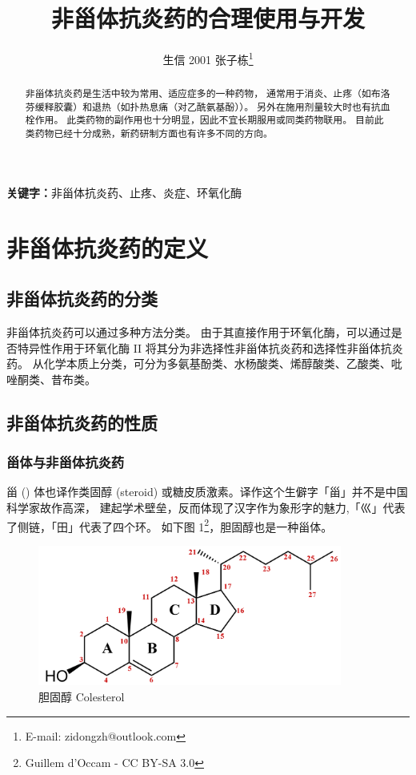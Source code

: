 \documentclass[12pt, a4paper, oneside]{ctexart}
\title{非甾体抗炎药的合理使用与开发}
\author{生信 2001 张子栋\thanks{E-mail: zidongzh@outlook.com}}
\date{}
\begin{document}
\maketitle
\thispagestyle{empty}
\newpage

\tableofcontents

\thispagestyle{empty}
\setcounter{page}{0}

\newpage

\begin{abstract}
    非甾体抗炎药是生活中较为常用、适应症多的一种药物，
    通常用于消炎、止疼（如布洛芬缓释胶囊）和退热（如扑热息痛（对乙酰氨基酚））。
    另外在施用剂量较大时也有抗血栓作用。
    此类药物的副作用也十分明显，因此不宜长期服用或同类药物联用。
    目前此类药物已经十分成熟，新药研制方面也有许多不同的方向。
\end{abstract}

\textbf{关键字：}非甾体抗炎药、止疼、炎症、环氧化酶

\newpage
\section{非甾体抗炎药的定义}
\subsection{非甾体抗炎药的分类}
非甾体抗炎药可以通过多种方法分类。
由于其直接作用于环氧化酶，可以通过是否特异性作用于环氧化酶 II 
将其分为非选择性非甾体抗炎药和选择性非甾体抗炎药。
从化学本质上分类，可分为多氨基酚类、水杨酸类、烯醇酸类、乙酸类、吡唑酮类、昔布类。

\subsection{非甾体抗炎药的性质}
\subsubsection{甾体与非甾体抗炎药}
甾 ({}) 体也译作类固醇 (steroid) 或糖皮质激素。译作这个生僻字「甾」并不是中国科学家故作高深，
建起学术壁垒，反而体现了汉字作为象形字的魅力,「巛」代表了侧链，「田」代表了四个环\cite{ref1}。
如下图 1\footnote{Guillem d'Occam - CC BY-SA 3.0}，胆固醇也是一种甾体。

\begin{figure}[htbp]
    \centering
    \includegraphics[width=10cm,height=4.625cm]{Colesterol.png}
    \caption{胆固醇 Colesterol}
    \end{figure} 
\end{document}
